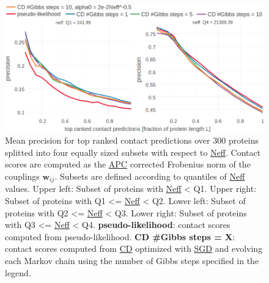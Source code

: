 \documentclass[11pt,a4paper,twoside]{book}
\newcommand{\wij}{\mathbf{w}_{ij}}
\theoremstyle{definition}
\theoremstyle{definition}
\theoremstyle{remark}
\begin{document}
\begin{figure}

{\centering \includegraphics[width=1\linewidth]{img/full_likelihood/appendix/precision_vs_rank_facetted_by_neff_gibbssteps} 

}

\caption{Mean precision for top ranked
contact predictions over 300 proteins splitted into four equally sized
subsets with respect to \protect\hyperlink{abbrev}{Neff}. Contact scores
are computed as the \protect\hyperlink{abbrev}{APC} corrected Frobenius
norm of the couplings \(\wij\). Subsets are defined according to
quantiles of \protect\hyperlink{abbrev}{Neff} values. Upper left: Subset
of proteins with \protect\hyperlink{abbrev}{Neff} \textless{} Q1. Upper
right: Subset of proteins with Q1 \textless{}=
\protect\hyperlink{abbrev}{Neff} \textless{} Q2. Lower left: Subset of
proteins with Q2 \textless{}= \protect\hyperlink{abbrev}{Neff}
\textless{} Q3. Lower right: Subset of proteins with Q3 \textless{}=
\protect\hyperlink{abbrev}{Neff} \textless{} Q4.
\textbf{pseudo-likelihood}: contact scores computed from
pseudo-likelihood. \textbf{CD \#Gibbs steps = X}: contact scores
computed from \protect\hyperlink{abbrev}{CD} optimized with
\protect\hyperlink{abbrev}{SGD} and evolving each Markov chain using the
number of Gibbs steps specified in the legend.}\label{fig:cd-precision-gibbssteps-neff}
\end{figure}
\end{document}
